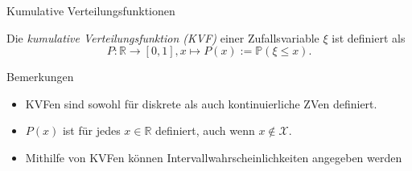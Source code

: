 \documentclass[
  8pt,
  ignorenonframetext,
]{beamer}
\begin{document}
\begin{frame}{Kumulative Verteilungsfunktionen}
\protect\hypertarget{kumulative-verteilungsfunktionen}{}
\small
\begin{definition}
\justifying
Die \textit{kumulative Verteilungsfunktion (KVF)} einer Zufallsvariable $\xi$ ist definiert als
\begin{equation}
P : \mathbb{R} \to [0,1], x \mapsto P(x) := \mathbb{P}(\xi \le x).
\end{equation}
\end{definition}

Bemerkungen

\begin{itemize}
\item KVFen sind sowohl für diskrete als auch kontinuierliche ZVen definiert.
\item $P(x)$ ist für jedes $x \in \mathbb{R}$ definiert, auch wenn $x \notin \mathcal{X}$.
\item Mithilfe von KVFen können Intervallwahrscheinlichkeiten angegeben werden
\end{itemize}
\end{frame}
\end{document}
